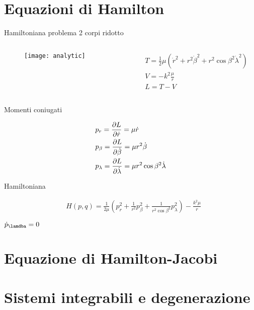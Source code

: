 \section{Equazioni di Hamilton}

\begin{frame}{Hamiltoniana problema 2 corpi ridotto}

\begin{columns}

\begin{column}{0.2\textwidth}

\begin{figure}[!ht]

\texttt{[image: analytic]}

\end{figure}


\end{column}

\begin{column}{0.8\textwidth}

\begin{align*}
&T=\frac{1}{2}\mu(\dot{r}^2+r^2\dot{\beta}^2+r^2\cos{\beta}^2\dot{\lambda}^2)\\
&V=-k^2\frac{\mu}{r}\\
&L=T-V
\end{align*}

\end{column}

\end{columns}

\begin{block}{Momenti coniugati}

\begin{align*}
&p_r=\PDy{\dot{r}}{L}=\mu\dot{r}\\
&p_{\beta}=\PDy{\dot{\beta}}{L}=\mu r^2\dot{\beta}\\
&p_{\lambda}=\PDy{\dot{\lambda}}{L}=\mu r^2\cos{\beta}^2\dot{\lambda}
\end{align*}

\end{block}

\begin{block}{Hamiltoniana}

\begin{align*}
&H(p,q)=\frac{1}{2\mu}(p_r^2+\frac{1}{r^2}p_{\beta}^2+\frac{1}{r^2\cos{\beta}^2}p_{\lambda}^2)-\frac{k^2\mu}{r}
\end{align*}

$\dot{p}_{\lamdba}=0$


\end{block}

\end{frame}


\section{Equazione di Hamilton-Jacobi}



\section{Sistemi integrabili e degenerazione}


